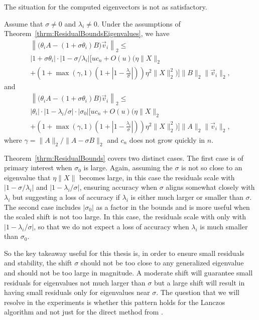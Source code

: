 The situation for the computed eigenvectors is not as satisfactory.
\begin{theorem}\label{thrm:ResidualBounds}
	Assume that $\sigma\neq 0$ and $\lambda_i\neq 0$.  Under the assumptions of Theorem~\ref{thrm:ResidualBoundsEigenvalues}, we have
	\begin{multline*}
		\left\| \big(\theta_i A - (1+\sigma \theta_i) B\big) \vec{v}_i \right\|_2
		\leq \\
		|1+\sigma \theta_i| \cdot |1-\sigma/\lambda_i| \Bigg[
		uc_n +O(u)\Bigg( \eta\|X\|_2 \\
		+ \left(1 + \max(\gamma, 1)
		\left(1+ \left| 1 - \frac{\lambda_i}{\sigma}\right|\right)\right)
		\eta^2\|X\|_2^2 \Bigg) \Bigg] \|B\|_2 \|\vec{v}_i\|_2,
	\end{multline*}
	and
	\begin{multline*}
		\left\| \big(\theta_i A - (1+\sigma \theta_i) B\big) \vec{v}_i \right\|_2
		\leq \\
		|\theta_i| \cdot |1-\lambda_i/\sigma| \cdot |\sigma_0| \Bigg[
		uc_n +O(u)\Bigg( \eta\|X\|_2 \\
		+ \left(1 + \max(\gamma, 1) \left(1+ \left| 1
		- \frac{\lambda_i}{\sigma}\right|\right)\right)
		\eta^2\|X\|_2^2 \Bigg) \Bigg] \|A\|_2 \|\vec{v}_i\|_2,
	\end{multline*}
        where $\gamma = \|A\|_2/ \|A-\sigma B\|_2$ and $c_n$ does not grow quickly in $n$.
\end{theorem}

Theorem~\ref{thrm:ResidualBounds} covers two distinct cases. The first case is of primary interest when $\sigma_0$ is large. Again, assuming the $\sigma$ is not so close to an eigenvalue that $\eta \|X\|$ becomes large, in this case the residuals scale with $\lvert 1 - \sigma/ \lambda_i \rvert$ and $\lvert 1 - \lambda_i/\sigma\rvert$, ensuring accuracy when $\sigma$ aligns somewhat closely with $\lambda_i$ but suggesting a loss of accuracy if $\lambda_i$ is either much larger or smaller than $\sigma$. The second case includes $|\sigma_0|$ as a factor in the bounds and is more useful when the scaled shift is not too large.  In this case, the residuals scale with only with $\lvert 1 - \lambda_i/\sigma\rvert$, so that we do not expect a loss of accuracy when $\lambda_i$ is much smaller than $\sigma_0$.

So the key takeaway useful for this thesis is, in order to ensure small residuals and stability, the shift $\sigma$ should not be too close to any generalized eigenvalue and should not be too large in magnitude. A moderate shift will guarantee small residuals for eigenvalues not much larger than $\sigma$ but a large shift will result in having small residuals only for eigenvalues near $\sigma$. The question that we will resolve in the experiments is whether this pattern holds for the Lanczos algorithm and not just for the direct method from \cite{stewart2024spectraltransformationdensesymmetric}.

